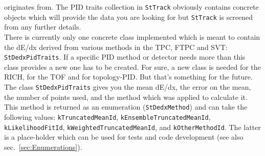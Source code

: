 \documentclass[twoside]{article}
\begin{document}
originates from.  The PID traits collection in \texttt{StTrack}
obviously contains concrete objects which will provide the data you
are looking for but \texttt{StTrack} is screened from any further details. \\
There is currently only one concrete class implemented which is meant
to contain the dE/dx derived from various methods in the TPC, FTPC and
SVT: \texttt{StDedxPidTraits}. If a specific PID method or detector
needs more than this class provides a new one has to be created. For
sure, a new class is needed for the RICH, for the TOF and for
topology-PID.  But that's something
for the future.\\
The class \texttt{StDedxPidTraits} gives you the mean dE/dx, the error
on the mean, the number of points used, and the method which was applied to
calculate it.  This method is returned as an enumeration
(\texttt{StDedxMethod}) and can take the following values:
\texttt{kTruncatedMeanId}, \texttt{kEnsembleTruncatedMeanId},
\texttt{kLikelihoodFitId}, \texttt{kWeightedTruncatedMeanId}, and
\texttt{kOtherMethodId}. The latter is a place-holder which can be
used for tests and code development (see also
sec.~\ref{sec:Enumerations}).
\end{document}
